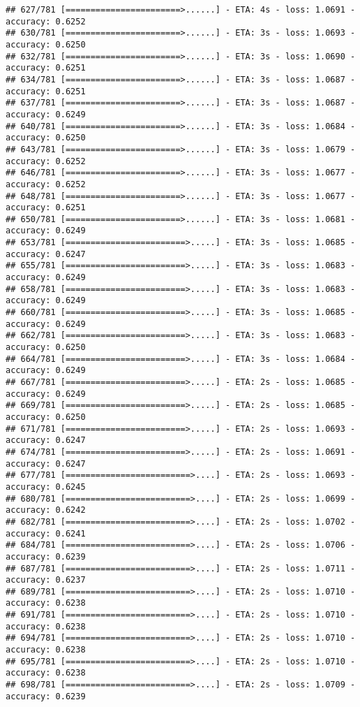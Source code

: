 \documentclass[
]{article}
\begin{document}
\begin{verbatim}
## 627/781 [=======================>......] - ETA: 4s - loss: 1.0691 - accuracy: 0.6252
## 630/781 [=======================>......] - ETA: 3s - loss: 1.0693 - accuracy: 0.6250
## 632/781 [=======================>......] - ETA: 3s - loss: 1.0690 - accuracy: 0.6251
## 634/781 [=======================>......] - ETA: 3s - loss: 1.0687 - accuracy: 0.6251
## 637/781 [=======================>......] - ETA: 3s - loss: 1.0687 - accuracy: 0.6249
## 640/781 [=======================>......] - ETA: 3s - loss: 1.0684 - accuracy: 0.6250
## 643/781 [=======================>......] - ETA: 3s - loss: 1.0679 - accuracy: 0.6252
## 646/781 [=======================>......] - ETA: 3s - loss: 1.0677 - accuracy: 0.6252
## 648/781 [=======================>......] - ETA: 3s - loss: 1.0677 - accuracy: 0.6251
## 650/781 [=======================>......] - ETA: 3s - loss: 1.0681 - accuracy: 0.6249
## 653/781 [========================>.....] - ETA: 3s - loss: 1.0685 - accuracy: 0.6247
## 655/781 [========================>.....] - ETA: 3s - loss: 1.0683 - accuracy: 0.6249
## 658/781 [========================>.....] - ETA: 3s - loss: 1.0683 - accuracy: 0.6249
## 660/781 [========================>.....] - ETA: 3s - loss: 1.0685 - accuracy: 0.6249
## 662/781 [========================>.....] - ETA: 3s - loss: 1.0683 - accuracy: 0.6250
## 664/781 [========================>.....] - ETA: 3s - loss: 1.0684 - accuracy: 0.6249
## 667/781 [========================>.....] - ETA: 2s - loss: 1.0685 - accuracy: 0.6249
## 669/781 [========================>.....] - ETA: 2s - loss: 1.0685 - accuracy: 0.6250
## 671/781 [========================>.....] - ETA: 2s - loss: 1.0693 - accuracy: 0.6247
## 674/781 [========================>.....] - ETA: 2s - loss: 1.0691 - accuracy: 0.6247
## 677/781 [=========================>....] - ETA: 2s - loss: 1.0693 - accuracy: 0.6245
## 680/781 [=========================>....] - ETA: 2s - loss: 1.0699 - accuracy: 0.6242
## 682/781 [=========================>....] - ETA: 2s - loss: 1.0702 - accuracy: 0.6241
## 684/781 [=========================>....] - ETA: 2s - loss: 1.0706 - accuracy: 0.6239
## 687/781 [=========================>....] - ETA: 2s - loss: 1.0711 - accuracy: 0.6237
## 689/781 [=========================>....] - ETA: 2s - loss: 1.0710 - accuracy: 0.6238
## 691/781 [=========================>....] - ETA: 2s - loss: 1.0710 - accuracy: 0.6238
## 694/781 [=========================>....] - ETA: 2s - loss: 1.0710 - accuracy: 0.6238
## 695/781 [=========================>....] - ETA: 2s - loss: 1.0710 - accuracy: 0.6238
## 698/781 [=========================>....] - ETA: 2s - loss: 1.0709 - accuracy: 0.6239

\end{verbatim}
\end{document}
